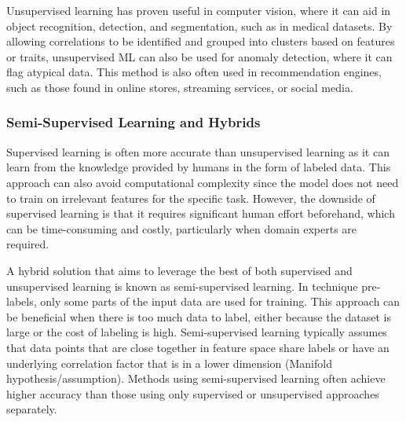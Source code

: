         Unsupervised learning has proven useful in computer vision, where it can aid in object recognition, detection, and segmentation, such as in medical datasets. By allowing correlations to be identified and grouped into clusters based on features or traits, unsupervised ML can also be used for anomaly detection, where it can flag atypical data. This method is also often used in recommendation engines, such as those found in online stores, streaming services, or social media.


        \subsubsection{Semi-Supervised Learning and Hybrids}


        Supervised learning is often more accurate than unsupervised learning as it can learn from the knowledge provided by humans in the form of labeled data. This approach can also avoid computational complexity since the model does not need to train on irrelevant features for the specific task. However, the downside of supervised learning is that it requires significant human effort beforehand, which can be time-consuming and costly, particularly when domain experts are required.

        A hybrid solution that aims to leverage the best of both supervised and unsupervised learning is known as semi-supervised learning. In technique pre-labels, only some parts of the input data are used for training. This approach can be beneficial when there is too much data to label, either because the dataset is large or the cost of labeling is high. Semi-supervised learning typically assumes that data points that are close together in feature space share labels or have an underlying correlation factor that is in a lower dimension (Manifold hypothesis/assumption). Methods using semi-supervised learning often achieve higher accuracy than those using only supervised or unsupervised approaches separately.
        
